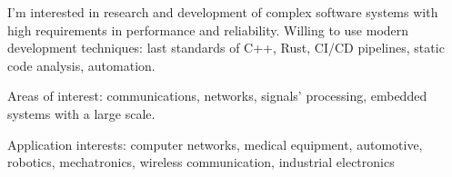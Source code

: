 


\begin{cventries}


\begin{flushleft}

I'm interested in research and development of complex software systems with high requirements in performance and reliability.
Willing to use modern development techniques: last standards of C++, Rust, CI/CD pipelines, static code analysis, automation.
\newline

Areas of interest: communications, networks, signals' processing, embedded systems with a large scale. 
\newline

Application interests: computer networks, medical equipment, automotive, robotics, mechatronics, wireless communication, industrial electronics
\end{flushleft}


\end{cventries}